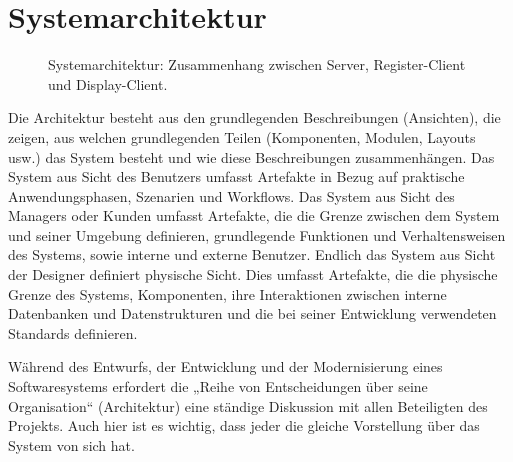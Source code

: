 \section{Systemarchitektur}
\label{sec:design:arch}
\begin{figure}
	\centering
	\caption{Systemarchitektur: Zusammenhang  zwischen Server, Register-Client und Display-Client.}
	\label{fig:class}
\end{figure}
Die Architektur besteht aus den grundlegenden Beschreibungen (Ansichten),  die zeigen, aus welchen grundlegenden Teilen (Komponenten, Modulen, Layouts usw.) das System besteht und wie diese Beschreibungen zusammenhängen. Das System aus Sicht des Benutzers umfasst Artefakte in Bezug auf praktische Anwendungsphasen, Szenarien und Workflows. Das System aus Sicht des Managers oder Kunden umfasst Artefakte, die die Grenze zwischen dem System und seiner Umgebung definieren, grundlegende Funktionen und Verhaltensweisen des Systems, sowie interne und externe Benutzer. Endlich das System aus Sicht der Designer definiert physische Sicht. Dies umfasst Artefakte, die die physische Grenze des Systems, Komponenten, ihre Interaktionen zwischen interne Datenbanken und Datenstrukturen und die bei seiner Entwicklung verwendeten Standards definieren.

Während des Entwurfs, der Entwicklung und der Modernisierung eines Softwaresystems erfordert die „Reihe von Entscheidungen über seine Organisation“ (Architektur) eine ständige Diskussion mit allen Beteiligten des Projekts. Auch hier ist es wichtig, dass jeder die gleiche Vorstellung über das System von sich hat. 

